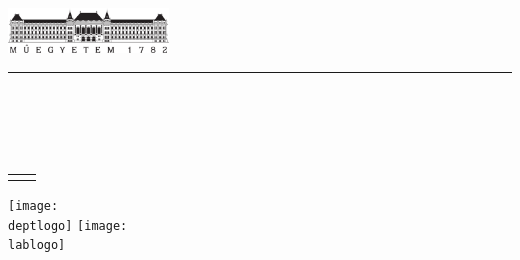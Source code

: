 \newcommand{\HRule}{\rule{\linewidth}{1pt}}

\begin{titlepage}
\begin{center}

\includegraphics[height=1.2cm]{logos/BME1782.pdf}
\HRule\par
{\small \textsc{ \bfseries \schoolname \\
\facultyname \\
\doctoralname}}\par

\vfill

{
\Large
\makeatletter
\@title
\makeatother
} \par
\bigskip
\bookname \par
\bigskip
{
\normalsize
\theauthor\\[.5ex]
\authorprof
}\par

\vfill
\begin{tabular}{@{}p{3cm}l@{}}
	\supervisorname & \supervisor \\
\end{tabular}

\vspace{\fill}

\hspace{1.0cm} \texttt{[image: \\deptlogo]} \hspace{2cm}
\texttt{[image: \\lablogo]} \par

\normalsize
\creationdate



\end{center}


\end{titlepage}
